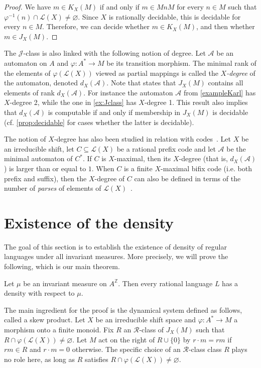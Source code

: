\documentclass[a4paper,UKenglish,numberwithinsect,cleveref]{lipics-v2021}
\newcommand{\JJ}{\mathrel{\mathscr{J}}}
\newcommand{\RR}{\mathrel{\mathscr{R}}}
\newcommand{\A}{\mathcal A}
\newcommand{\Z}{\mathbb{Z}}
\newcommand{\cL}{\mathcal L}
\newcommand*{\from}{\colon}
\begin{document}
\begin{proof}
    We have $m\in K_X(M)$ if and only if $m\in MnM$ for every $n\in M$ such that $\varphi^{-1}(n)\cap \cL(X)\ne\varnothing$. Since $X$ is rationally decidable, this is decidable for every $n\in M$. Therefore, we can decide whether $m\in K_X(M)$, and then whether $m\in J_X(M)$.
\end{proof}


The $\JJ$-class is also linked with the following notion of degree. Let $\A$ be an automaton on $A$ and $\varphi\from A^*\to M$ be its transition morphism. The minimal rank of the elements of $\varphi(\cL(X))$ viewed as partial mappings is called the \emph{$X$-degree} of the automaton, denoted $d_X(\A)$. Note that \cite[Proposition~3.2]{Perrin2015} states that $J_X(M)$ contains all elements of rank $d_X(\A)$. For instance the automaton $\A$ from \cref{exampleKarl} has $X$-degree 2, while the one in \cref{ex:Jclass} has $X$-degree 1. This result also implies that $d_X(\A)$ is computable if and only if membership in $J_X(M)$ is decidable (cf.  \cref{prop:decidable} for cases whether the latter is decidable).


The notion of $X$-degree has also been studied in relation with codes~\cite{BerstelDeFelicePerrinReutenauerRindone2012,Almeida2020}. Let $X$ be an irreducible shift, let $C\subseteq\cL(X)$ be a rational prefix code and let $\A$ be the minimal automaton of $C^*$.  If $C$ is $X$-maximal, then its $X$-degree (that is, $d_X(\A)$) is larger than or equal to $1$. When $C$ is a finite $X$-maximal bifix code (i.e. both prefix and suffix),  then the $X$-degree of $C$ can also be defined in terms of the number of \emph{parses} of elements of  $\cL(X)$~\cite{BerstelDeFelicePerrinReutenauerRindone2012}. 

\section{Existence of  the density}
\label{sec:existence}
    
The goal of this section is to establish the existence of density of regular languages under all invariant measures. More precisely, we will prove the following, which is our main theorem. 
\begin{theorem}\label{theoremMain}
    Let $\mu$ be an invariant measure on $A^\Z$. Then every rational language $L$ has a density with respect to $\mu$. 
\end{theorem}

The main ingredient for the proof is the dynamical system defined as follows, called a skew product. Let $X$ be an irreducible shift space and $\varphi\colon A^*\to M$ a morphism onto a finite monoid. Fix $R$ an $\RR$-class of $J_X(M)$ such that $R\cap\varphi(\cL(X))\neq\varnothing$. Let $M$ act on the right of $R\cup\{0\}$ by $r\cdot m = rm$ if $rm\in R$ and $r\cdot m=0$ otherwise. 
The  specific choice  of  an $\RR$-class class $R$ plays no role here, as long as $R$ satisfies $R\cap\varphi(\cL(X))\neq\varnothing$.
\end{document}

